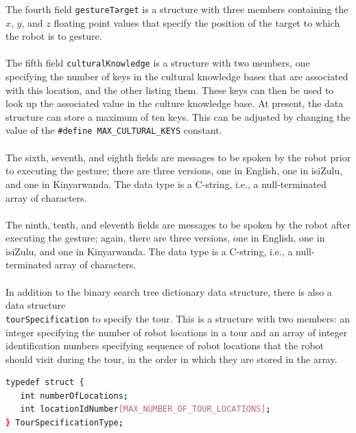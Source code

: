 \documentclass{CSSRforAfrica}
\begin{document}
The fourth field {\small \tt gestureTarget} is a structure with three members containing the $x$, $y$, and $z$ floating point values that specify the position of the target to which the robot is to gesture.  
\\~\\
The fifth field {\small \tt culturalKnowledge} is a structure with two members, one specifying the number of keys in the cultural knowledge bases that are associated with this location, and the other listing them.  These keys can then be used to look up the associated value in the culture knowledge base. At present, the data structure can store a maximum of ten keys. This can be adjusted by changing the value of the {\small \verb+#define MAX_CULTURAL_KEYS+} constant.
\\~\\
The  sixth, seventh, and eighth fields are messages to be spoken by the robot prior to executing the gesture; there are three versions, one in English, one in isiZulu, and one in Kinyarwanda. The data type  is a C-string, i.e., a null-terminated array of characters.
\\~\\
The  ninth,  tenth, and eleventh fields are messages to be spoken by the robot after executing the gesture; again, there are three versions, one in English, one in isiZulu, and one in Kinyarwanda. The data type  is a C-string, i.e., a null-terminated array of characters.
\\~\\
In addition to the binary search tree dictionary data structure, there is also a data structure\\ {\small \tt tourSpecification} to specify the tour. This is a structure with two members: an integer specifying the number of robot locations in a tour and an array of  integer identification numbers specifying sequence of robot locations  that the robot should visit during the tour, in the order in which they are stored in the array.

\begin{lstlisting}[style=withoutNumbering, language=bash]
typedef struct {
   int numberOfLocations;
   int locationIdNumber[MAX_NUMBER_OF_TOUR_LOCATIONS];
} TourSpecificationType;

\end{lstlisting}
\end{document}
